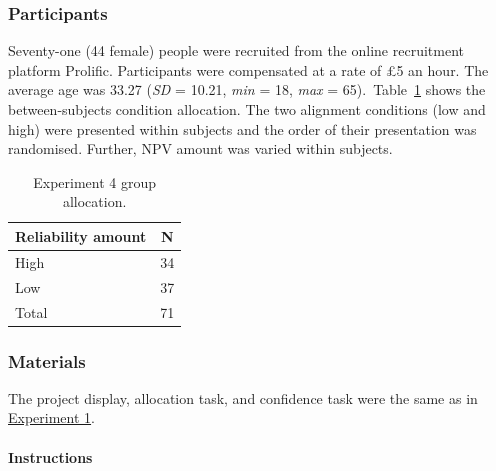 \documentclass[a4paper, nobind, dvipsnames]{templates/ociamthesis}
\theoremstyle{definition}
\theoremstyle{definition}
\theoremstyle{definition}
\theoremstyle{definition}
\theoremstyle{remark}
\begin{document}
\hypertarget{participants-12}{%
\subsubsection{Participants}\label{participants-12}}

Seventy-one (44 female) people were recruited from the online recruitment platform Prolific. Participants were compensated at a rate of £5 an hour. The average age was 33.27 (\emph{SD} = 10.21, \emph{min} = 18, \emph{max} = 65).~Table~\ref{tab:condition-allocation-alignment-1}
shows the between-subjects condition allocation. The two alignment conditions
(low and high) were presented within subjects and the order of their
presentation was randomised. Further, NPV amount was varied within subjects.

\begin{table}[tbp]

\begin{center}
\begin{threeparttable}

\caption{\label{tab:condition-allocation-alignment-1}Experiment 4 group allocation.}

\begin{tabular}{ll}
\toprule
Reliability amount & \multicolumn{1}{c}{N}\\
\midrule
High & 34\\
Low & 37\\
Total & 71\\
\bottomrule
\end{tabular}

\end{threeparttable}
\end{center}

\end{table}

\hypertarget{materials-12}{%
\subsubsection{Materials}\label{materials-12}}

The project display, allocation task, and confidence task were the same as in
\protect\hyperlink{materials-alignment-2}{Experiment 1}.

\hypertarget{instructions-7}{%
\paragraph{Instructions}\label{instructions-7}}
\end{document}
